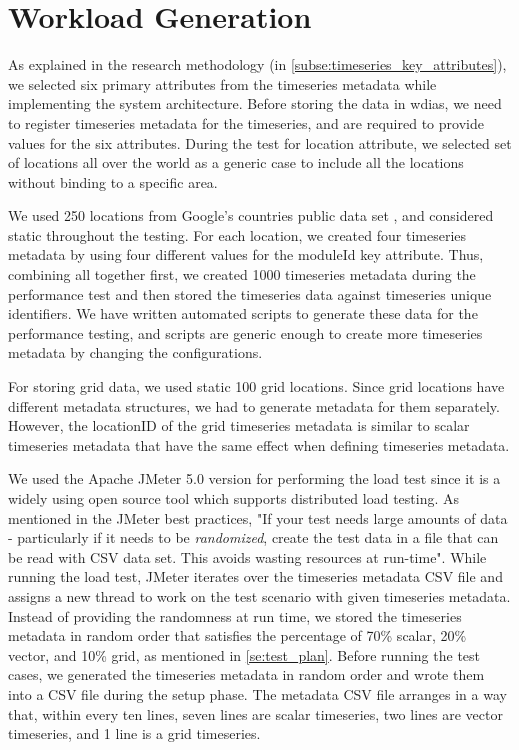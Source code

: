 \section{Workload Generation}
\label{se:workload}

As explained in the research methodology (in \cref{subse:timeseries_key_attributes}), we selected six primary attributes from the timeseries metadata while implementing the system architecture. Before storing the data in \acrshort{wdias}, we need to register timeseries metadata for the timeseries, and are required to provide values for the six attributes. During the test for location attribute, we selected set of locations all over the world as a generic case to include all the locations without binding to a specific area.

We used 250 locations from Google’s countries public data set \cite{GoogleGoogleCounties}, and considered static throughout the testing. For each location, we created four timeseries metadata by using four different values for the moduleId key attribute. Thus, combining all together first, we created 1000 timeseries metadata during the performance test and then stored the timeseries data against timeseries unique identifiers. We have written automated scripts to generate these data for the performance testing, and scripts are generic enough to create more timeseries metadata by changing the configurations.

For storing grid data, we used static 100 grid locations. Since grid locations have different metadata structures, we had to generate metadata for them separately. However, the locationID of the grid timeseries metadata is similar to scalar timeseries metadata that have the same effect when defining timeseries metadata.

We used the Apache JMeter 5.0 version \cite{ApacheSoftwareFoundationApacheJMeter} for performing the load test since it is a widely using open source tool which supports distributed load testing. As mentioned in the JMeter best practices, "If your test needs large amounts of data - particularly if it needs to be \emph{randomized}, create the test data in a file that can be read with CSV data set. This avoids wasting resources at run-time". While running the load test, JMeter iterates over the timeseries metadata CSV file and assigns a new thread to work on the test scenario with given timeseries metadata. Instead of providing the randomness at run time, we stored the timeseries metadata in random order that satisfies the percentage of 70\% scalar, 20\% vector, and 10\% grid, as mentioned in \cref{se:test_plan}.
Before running the test cases, we generated the timeseries metadata in random order and wrote them into a CSV file during the setup phase. The metadata CSV file arranges in a way that, within every ten lines, seven lines are scalar timeseries, two lines are vector timeseries, and 1 line is a grid timeseries.

